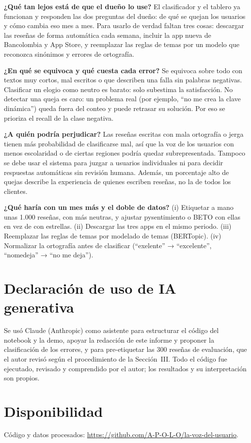 \documentclass[conference]{IEEEtran}
\begin{document}
\textbf{¿Qué tan lejos está de que el dueño lo use?} El clasificador y el tablero ya funcionan y responden las dos
preguntas del dueño: de qué se quejan los usuarios y cómo cambia eso mes a mes. Para usarlo de verdad faltan tres
cosas: descargar las reseñas de forma automática cada semana, incluir la app nueva de Bancolombia y App Store, y
reemplazar las reglas de temas por un modelo que reconozca sinónimos y errores de ortografía.

\textbf{¿En qué se equivoca y qué cuesta cada error?} Se equivoca sobre todo con textos muy cortos, mal escritos o
que describen una falla sin palabras negativas. Clasificar un elogio como neutro es barato: solo subestima la
satisfacción. No detectar una queja es caro: un problema real (por ejemplo, ``no me crea la clave dinámica'') queda
fuera del conteo y puede retrasar su solución. Por eso se prioriza el recall de la clase negativa.

\textbf{¿A quién podría perjudicar?} Las reseñas escritas con mala ortografía o jerga tienen más probabilidad de
clasificarse mal, así que la voz de los usuarios con menos escolaridad o de ciertas regiones podría quedar
subrepresentada. Tampoco se debe usar el sistema para juzgar a usuarios individuales ni para decidir
respuestas automáticas sin revisión humana. Además, un porcentaje alto de quejas describe la experiencia de quienes
escriben reseñas, no la de todos los clientes.

\textbf{¿Qué haría con un mes más y el doble de datos?} (i) Etiquetar a mano unas 1.000 reseñas, con más neutras,
y ajustar pysentimiento o BETO con ellas en vez de con estrellas. (ii) Descargar las tres apps en el mismo periodo.
(iii) Reemplazar las reglas de temas por modelado de temas (BERTopic). (iv) Normalizar la ortografía antes de
clasificar (``exelente'' → ``excelente'', ``nomedeja'' → ``no me deja'').

\section*{Declaración de uso de IA generativa}
Se usó Claude (Anthropic) como asistente para estructurar el código del notebook y la demo, apoyar la redacción
de este informe y proponer la clasificación de los errores, y para pre-etiquetar las 300 reseñas de evaluación, que el
autor revisó según el procedimiento de la Sección~III.
Todo el código fue ejecutado, revisado y comprendido por el autor; los resultados y su interpretación son propios.

\section*{Disponibilidad}
Código y datos procesados: \url{https://github.com/A-P-O-L-O/la-voz-del-usuario}.



\end{document}
